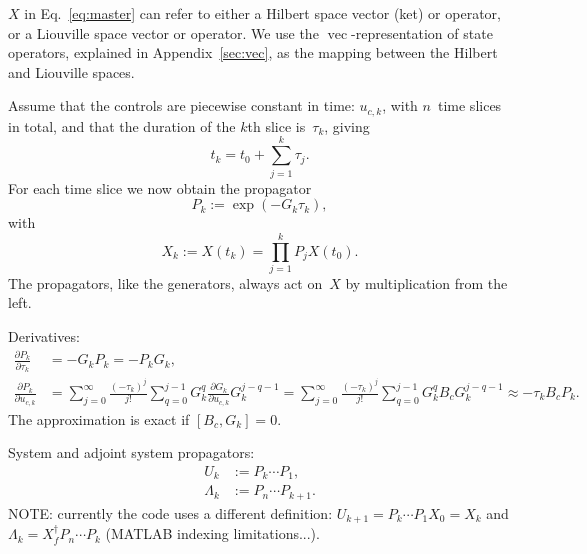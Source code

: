 \documentclass[aps, pra, a4paper, longbibliography]{revtex4}
\newcommand{\be}{\begin{equation}}
\newcommand{\ee}{\end{equation}}
\newcommand{\comm}[2]{\left[ #1, #2 \right]}
\DeclareMathOperator{\cvec}{vec}
\newcommand{\dd}[2]{\frac{\partial #1}{\partial #2}}
\begin{document}
$X$ in Eq.~\eqref{eq:master} can refer to either a Hilbert space
vector (ket) or operator, or a Liouville space vector
or operator.
We use the $\cvec$-representation of state
operators, explained in Appendix~\ref{sec:vec},
as the mapping between the Hilbert and Liouville spaces.


Assume that the controls are
piecewise constant in time: $u_{c, k}$, with $n$~time slices in total,
and that the duration of the $k$th slice is~$\tau_k$, giving
\be
t_k = t_0 + \sum_{j=1}^{k} \tau_j.
\ee
For each time slice we now obtain the propagator
\be
P_k := \exp(-G_k \tau_k),
\ee
with
\be
X_k := X(t_k) = \prod_{j=1}^{k} P_j X(t_0).
\ee
The propagators, like the generators, always act on~$X$ by multiplication
from the left.

Derivatives:
\begin{align}
\dd{P_k}{\tau_k}  &= -G_k P_k = -P_k G_k,\\
\dd{P_k}{u_{c,k}}
&=
\sum_{j=0}^{\infty} \frac{(-\tau_k)^j}{j!}
\sum_{q=0}^{j-1}
G_k^{q} \dd{G_k}{u_{c,k}} G_k^{j-q-1}
=
\sum_{j=0}^{\infty} \frac{(-\tau_k)^j}{j!}
\sum_{q=0}^{j-1}
G_k^{q} B_c G_k^{j-q-1}
\approx -\tau_k B_c P_k.
\end{align}
The approximation is exact if $\comm{B_c}{G_k} = 0$.


System and adjoint system propagators:
\begin{align}
U_k &:= P_k \cdots P_1,\\      %
\Lambda_k &:= P_n \cdots P_{k+1}.
\end{align}
NOTE: currently the code uses a different definition:
$U_{k+1} = P_k \cdots P_1 X_0 = X_k$ and
$\Lambda_k = X_f^\dagger P_n \cdots P_k$ (MATLAB indexing limitations...).
\end{document}
